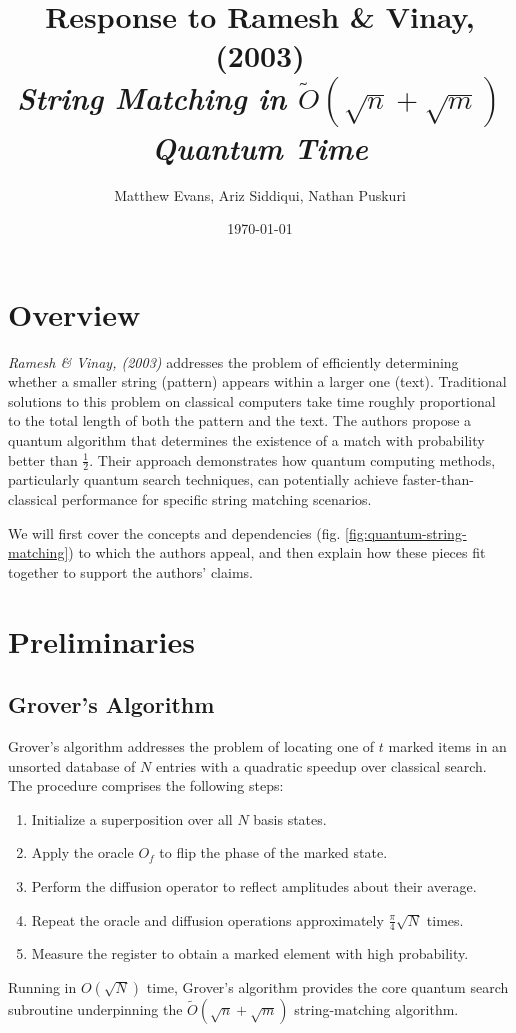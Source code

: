 \documentclass[12pt]{IEEEtran}
\title{\Large{Response to Ramesh \& Vinay, (2003)\\ \small{\textit{String Matching in \(\tilde{O}(\sqrt{n} + \sqrt{m})\) Quantum Time}} }}
\author{%
\normalsize{Matthew Evans, Ariz Siddiqui, Nathan Puskuri}
}
\date{\today}
\begin{document}
\maketitle

\section{Overview}
\textit{Ramesh \& Vinay, (2003)}\cite{RameshH2003SmiO} addresses the problem of efficiently determining whether a smaller string (pattern) appears within a larger one (text). Traditional solutions to this problem on classical computers take time roughly proportional to the total length of both the pattern and the text. The authors propose a quantum algorithm that determines the existence of a match with probability better than \(\frac{1}{2}\). Their approach demonstrates how quantum computing methods, particularly quantum search techniques, can potentially achieve faster-than-classical performance for specific string matching scenarios.

We will first cover the concepts and dependencies (fig. \ref{fig:quantum-string-matching}) to which the authors appeal, and then explain how these pieces fit together to support the authors' claims.

\section{Preliminaries}
\subsection{Grover's Algorithm}
Grover's algorithm \cite{grover1996fastquantummechanicalalgorithm} addresses the problem of locating one of \(t\) marked items in an unsorted database of \(N\) entries with a quadratic speedup over classical search. The procedure comprises the following steps:
\begin{enumerate}
    \item Initialize a superposition over all \(N\) basis states.
    \item Apply the oracle \(O_f\) to flip the phase of the marked state.
    \item Perform the diffusion operator to reflect amplitudes about their average.
    \item Repeat the oracle and diffusion operations approximately \(\frac{\pi}{4}\sqrt{N}\) times.
    \item Measure the register to obtain a marked element with high probability.
\end{enumerate}
Running in \(O(\sqrt{N})\) time, Grover's algorithm provides the core quantum search subroutine underpinning the \(\widetilde{O}(\sqrt{n}+\sqrt{m})\) string-matching algorithm.
\end{document}

